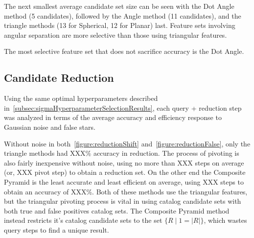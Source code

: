 The next smallest average candidate set size can be seen with the Dot Angle method (5 candidates), followed by the
Angle method (11 candidates), and the triangle methods (13 for Spherical, 12 for Planar) last.
Feature sets involving angular separation are more selective than those using triangular features.

The most selective feature set that does not sacrifice accuracy is the Dot Angle.

\subsection{Candidate Reduction}\label{subsec:candidateReductionResults}
Using the same optimal hyperparameters described in~\autoref{subsec:sigmaHyperparameterSelectionResults}, each query +
reduction step was analyzed in terms of the average accuracy and efficiency response to Gaussian noise and false stars.

\begin{figure}
\end{figure}

Without noise in both~\autoref{figure:reductionShift} and~\autoref{figure:reductionFalse}, only the triangle methods
had XXX\% accuracy in reduction.
The process of pivoting is also fairly inexpensive without noise, using no more than XXX steps on average
(or, XXX pivot step) to obtain a reduction set.
On the other end the Composite Pyramid is the least accurate and least efficient on average, using XXX steps to
obtain an accuracy of XXX\%.
Both of these methods use the triangular features, but the triangular pivoting process is vital in using catalog
candidate sets with both true and false positives catalog sets.
The Composite Pyramid method instead restricts it's catalog candidate sets to the set $\{R \mid 1 = |R| \}$, which
wastes query steps to find a unique result.

